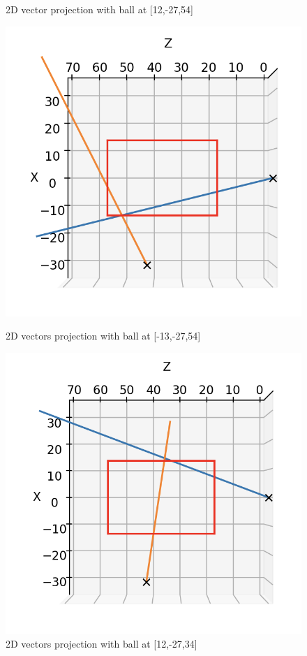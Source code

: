 \documentclass{article}
\begin{document}
\begin{figure}[h!]
\begin{minipage}[b]{0.5\linewidth}
    \caption{\label{fig:2}2D vector projection with ball at [12,-27,54]} 
    \vspace{4ex}
  \end{minipage} 
  \begin{minipage}[b]{0.5\linewidth}
    \centering
    \includegraphics[width=.2\textheight]{33.png} 
    \caption{\label{fig:3}2D vectors projection with ball at [-13,-27,54]} 
    \vspace{4ex}
  \end{minipage}%
  \begin{minipage}[b]{0.5\linewidth}
    \centering
    \includegraphics[width=.2\textheight]{44.png} 
    \caption{\label{fig:4}2D vectors projection with ball at [12,-27,34]} 
    \vspace{4ex}
  \end{minipage} 
\end{figure}
\end{document}
